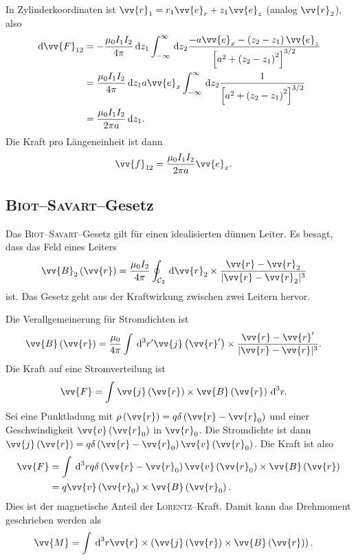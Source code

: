 \documentclass[a4paper,12pt]{article}
\newcommand{\td}{\,\text{d}}
\numberwithin{equation}{section}
\begin{document}
In Zylinderkoordinaten ist $\vv{r}_1=r_1\vv{e}_r+z_1\vv{e}_z$ (analog $\vv{r}_2$), also
\begin{align} 
        \td \vv{F}_{12}&=-\dfrac{\mu _0I_1I_2}{4\pi }\td z_1\int_{-\infty}^{\infty}\td z_2\dfrac{-a\vv{e}_x-\left(z_2-z_1\right)\vv{e}_z}{\left[a^2+\left(z_2-z_1\right)^2\right]^{3/2}}\\
                       &=\dfrac{\mu _0I_1I_2}{4\pi }\td z_1a\vv{e}_x\int_{-\infty}^{\infty}\td z_2\dfrac{1}{\left[a^2+\left(z_2-z_1\right)^2\right]^{3/2}}\\
                       &=\dfrac{\mu _0I_1I_2}{2\pi a}\td z_1
.\end{align} 
Die Kraft pro Längeneinheit ist dann
\begin{align} 
        \vv{f}_{12}&=\dfrac{\mu _0I_1I_2}{2\pi a}\vv{e}_x
.\end{align} 

\subsection{\textsc{Biot--Savart}--Gesetz}
Das \textsc{Biot--Savart}--Gesetz gilt für einen idealisierten dünnen Leiter. Es besagt, dass das Feld eines Leiters
\begin{align} 
        \vv{B}_2\left(\vv{r}\right)&=\dfrac{\mu _0I_2}{4\pi }\oint_{\mathcal{C}_2}^{}\td \vv{r}_2\times \dfrac{\vv{r}-\vv{r}_2}{|\vv{r}-\vv{r}_2|^3}
\end{align} 
ist. Das Gesetz geht aus der Kraftwirkung zwischen zwei Leitern hervor.\par
Die Verallgemeinerung für Stromdichten ist
\begin{align} 
        \vv{B}\left(\vv{r}\right)&=\dfrac{\mu _0}{4\pi }\int_{}^{}\td ^3r'\vv{j}\left(\vv{r}'\right)\times \dfrac{\vv{r}-\vv{r}'}{|\vv{r}-\vv{r}|^3}
.\end{align} 
Die Kraft auf eine Stromverteilung ist
\begin{align} 
        \vv{F}&=\int_{}^{}\vv{j}\left(\vv{r}\right)\times \vv{B}\left(\vv{r}\right)\td ^3r
.\end{align} 
Sei eine Punktladung mit $\rho \left(\vv{r}\right)=q\delta \left(\vv{r}-\vv{r}_0\right)$ und einer Geschwindigkeit $\vv{v}\left(\vv{r}_0\right)$ in $\vv{r}_0$.
Die Stromdichte ist dann $\vv{j}\left(\vv{r}\right)=q\delta \left(\vv{r}-\vv{r}_0\right)\vv{v}\left(\vv{r}_0\right)$.
Die Kraft ist also
\begin{align} 
        \vv{F}&=\int_{}^{}\td ^3rq\delta \left(\vv{r}-\vv{r}_0\right)\vv{v}\left(\vv{r}_0\right)\times \vv{B}\left(\vv{r}\right)\\
              &=q\vv{v}\left(\vv{r}_0\right)\times \vv{B}\left(\vv{r}_0\right)
.\end{align} 
Dies ist der magnetische Anteil der \textsc{Lorentz}--Kraft.
Damit kann das Drehmoment geschrieben werden als
\begin{align} 
        \vv{M}&=\int_{}^{}\td ^3r\vv{r}\times \left(\vv{j}\left(\vv{r}\right)\times \vv{B}\left(\vv{r}\right)\right)
.\end{align} 
\end{document}
